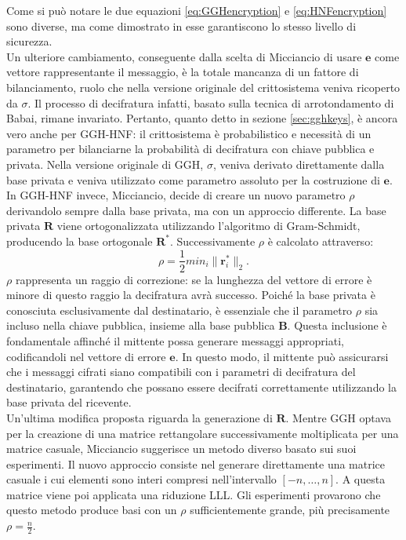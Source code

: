 Come si può notare le due equazioni \ref{eq:GGHencryption} e \ref{eq:HNFencryption} sono
diverse, ma come dimostrato in \cite[Sezione 4.3]{HNF01} esse garantiscono lo stesso
livello di sicurezza. \\
Un ulteriore cambiamento, conseguente dalla scelta di Micciancio di usare $\mathbf{e}$ come vettore
rappresentante il messaggio, è la totale mancanza di un fattore di bilanciamento, ruolo che nella
versione originale del crittosistema veniva ricoperto da $\sigma$. 
Il processo di decifratura infatti, 
basato sulla tecnica di arrotondamento di Babai, rimane invariato. Pertanto, quanto detto in 
sezione \ref{sec:gghkeys}, è ancora vero anche per GGH-HNF: il crittosistema è probabilistico 
e necessità di un parametro per bilanciarne la probabilità di decifratura con chiave pubblica e 
privata. 
Nella versione originale di GGH, $\sigma$, veniva derivato direttamente dalla base privata
e veniva utilizzato come parametro assoluto per la costruzione di $\mathbf{e}$. \\
In GGH-HNF invece, Micciancio, decide di creare un nuovo parametro $\rho$ derivandolo sempre
dalla base privata, ma con un approccio differente. 
La base privata $\mathbf{R}$ viene ortogonalizzata utilizzando l'algoritmo di Gram-Schmidt, 
producendo la base ortogonale $\mathbf{R}^*$. Successivamente $\rho$ è calcolato attraverso:
\[
    \rho = \frac{1}{2}min_i\|\mathbf{r}^*_i\|_2.
\]
$\rho$ rappresenta un raggio di correzione: se la lunghezza del vettore di errore 
è minore di questo raggio la decifratura avrà successo. 
Poiché la base privata è conosciuta esclusivamente dal destinatario, è essenziale che il parametro 
$\rho$ sia incluso nella chiave pubblica, insieme alla base pubblica $\mathbf{B}$. Questa inclusione è 
fondamentale affinché il mittente possa generare messaggi appropriati, codificandoli nel vettore di 
errore $\mathbf{e}$. In questo modo, il mittente può assicurarsi che i messaggi cifrati siano compatibili 
con i parametri di decifratura del destinatario, garantendo che possano essere decifrati correttamente 
utilizzando la base privata del ricevente.\\
Un'ultima modifica proposta riguarda la generazione di $\mathbf{R}$. Mentre GGH optava per la creazione 
di una matrice rettangolare successivamente moltiplicata per una matrice casuale, Micciancio suggerisce 
un metodo diverso basato sui suoi esperimenti.
Il nuovo approccio consiste nel generare direttamente una matrice casuale i cui elementi sono interi 
compresi nell'intervallo $[-n, \dots, n]$. A questa matrice viene poi applicata una riduzione LLL. 
Gli esperimenti provarono che questo metodo produce basi con un $\rho$ sufficientemente grande, più
precisamente $\rho = \frac{n}{2}$. 
%
%
